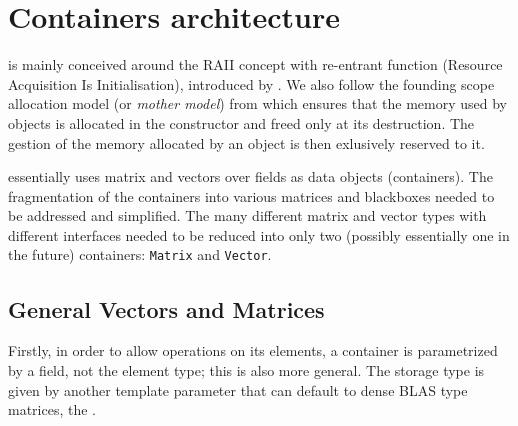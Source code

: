 \section{Containers architecture}\label{sec:container}
%
\linbox is mainly conceived around the RAII concept with re-entrant function
(Resource Acquisition Is Initialisation), introduced by
\cite{stroustrup1994design}. We also follow the {founding scope allocation}
model (or \emph{mother model}) from \cite{Dumas:2010:lbpar} which ensures that
the memory used by objects is allocated in the constructor and freed only at
its destruction. The gestion of the memory allocated by an object is then
exlusively reserved to it.
%
\par
%
\linbox essentially uses matrix and vectors over fields as data objects
(containers).  The fragmentation of the containers into various matrices and
blackboxes needed to be addressed and simplified. The many different matrix and
vector types with different interfaces needed to be reduced into only two
(possibly essentially one in the future) containers: \texttt{Matrix} and
\texttt{Vector}.
%
\subsection{General Vectors and Matrices}
%
Firstly, in order to allow operations on its elements, a container is
parametrized by a field, not the element type; this is also more general.  The
storage type is given by another template parameter that can default to \eg
dense BLAS type matrices, \cf the .
%

%

